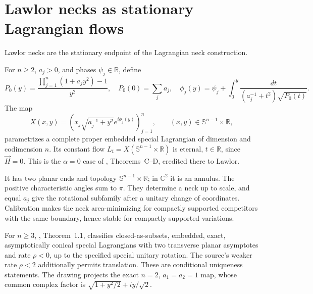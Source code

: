 \chapter{Lawlor necks as stationary Lagrangian flows}\label{sec:catalogue-lawlor-necks}
Lawlor necks are the stationary endpoint of the Lagrangian neck construction.
\begin{example}\label{ex:catalogue-lawlor-necks}
For $n\geq2$, $a_j>0$, and phases $\psi_j\in\mathbb R$, define
\[
 P_0(y)=\frac{\prod_{j=1}^n(1+a_jy^2)-1}{y^2},\quad
 P_0(0)=\sum_ja_j,\quad
 \phi_j(y)=\psi_j+\int_0^y\frac{dt}{(a_j^{-1}+t^2)\sqrt{P_0(t)}}.
\]
The map
\[
 X(x,y)=\left(x_j\sqrt{a_j^{-1}+y^2}e^{i\phi_j(y)}\right)_{j=1}^n,
 \qquad(x,y)\in\mathbb S^{n-1}\times\mathbb R,
\]
parametrizes a complete proper embedded special Lagrangian of dimension and codimension $n$. Its constant flow $L_t=X(\mathbb S^{n-1}\times\mathbb R)$ is eternal, $t\in\mathbb R$, since $\vec H=0$. This is the $\alpha=0$ case of \cite{CatJoyceLeeTsui2010}, Theorems~C--D, credited there to Lawlor.

It has two planar ends and topology $\mathbb S^{n-1}\times\mathbb R$; in $\mathbb C^2$ it is an annulus. The positive characteristic angles sum to $\pi$. They determine a neck up to scale, and equal $a_j$ give the rotational subfamily after a unitary change of coordinates. Calibration makes the neck area-minimizing for compactly supported competitors with the same boundary, hence stable for compactly supported variations.

For $n\geq3$, \cite{CatImagiJoyceOliveira2016}, Theorem~1.1, classifies closed-as-subsets, embedded, exact, asymptotically conical special Lagrangians with two transverse planar asymptotes and rate $\rho<0$, up to the specified special unitary rotation. The source's weaker rate $\rho<2$ additionally permits translation. These are conditional uniqueness statements. The drawing projects the exact $n=2$, $a_1=a_2=1$ map, whose common complex factor is $\sqrt{1+y^2/2}+iy/\sqrt2$.
\end{example}

